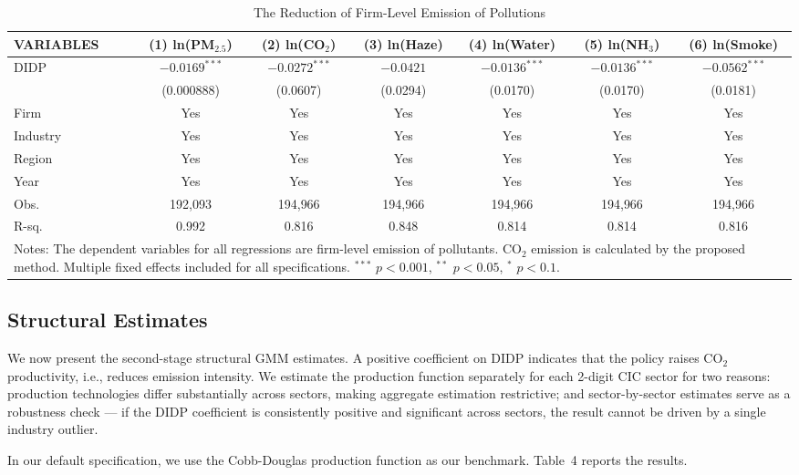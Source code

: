 \documentclass[11pt,a4paper]{article}
\begin{document}
\begin{table}[H]
\centering
\caption{The Reduction of Firm-Level Emission of Pollutions}
\label{tab:ddd}
\begin{tabular}{lcccccc}
\toprule
VARIABLES & (1) ln(PM$_{2.5}$) & (2) ln(CO$_2$) & (3) ln(Haze) & (4) ln(Water) & (5) ln(NH$_3$) & (6) ln(Smoke) \\
\midrule
DIDP & $-0.0169^{***}$ & $-0.0272^{***}$ & $-0.0421$ & $-0.0136^{***}$ & $-0.0136^{***}$ & $-0.0562^{***}$ \\
     & (0.000888)      & (0.0607)        & (0.0294)   & (0.0170)         & (0.0170)         & (0.0181) \\
Firm     & Yes & Yes & Yes & Yes & Yes & Yes \\
Industry & Yes & Yes & Yes & Yes & Yes & Yes \\
Region   & Yes & Yes & Yes & Yes & Yes & Yes \\
Year     & Yes & Yes & Yes & Yes & Yes & Yes \\
Obs.     & 192{,}093 & 194{,}966 & 194{,}966 & 194{,}966 & 194{,}966 & 194{,}966 \\
R-sq.    & 0.992 & 0.816 & 0.848 & 0.814 & 0.814 & 0.816 \\
\bottomrule
\multicolumn{7}{p{\textwidth}}{\footnotesize Notes: The dependent variables for all regressions are firm-level emission of pollutants. CO$_2$ emission is calculated by the proposed method. Multiple fixed effects included for all specifications. $^{***}$ $p<0.001$, $^{**}$ $p<0.05$, $^{*}$ $p<0.1$.}
\end{tabular}
\end{table}

\subsection{Structural Estimates}

We now present the second-stage structural GMM estimates. A positive coefficient on DIDP indicates that the policy raises CO$_2$ productivity, i.e., reduces emission intensity. We estimate the production function separately for each 2-digit CIC sector for two reasons: production technologies differ substantially across sectors, making aggregate estimation restrictive; and sector-by-sector estimates serve as a robustness check --- if the DIDP coefficient is consistently positive and significant across sectors, the result cannot be driven by a single industry outlier.

In our default specification, we use the Cobb-Douglas production function as our benchmark. Table~4 reports the results.
\end{document}
